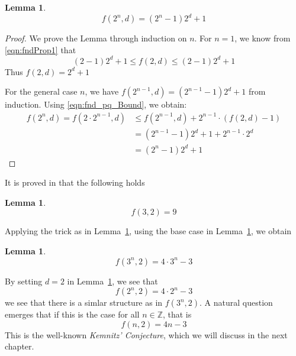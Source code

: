 \documentclass[12pt]{article}
\theoremstyle{definition}
\newtheorem{lemma}[theorem]{Lemma}
\numberwithin{equation}{theorem}
\numberwithin{figure}{theorem}
\newcommand{\kemnitzConjecture}{\emph{Kemnitz' Conjecture}}
\newcommand{\Integer}{\ensuremath{\mathbb{Z}}}
\newcommand{\fnd}[2]{\ensuremath{f(#1,#2)}}
\begin{document}
    \begin{lemma}\label{lem:f_nd_2_potent}
        \begin{equation*}
            \fnd{2^n}{d} = (2^n - 1) 2^d + 1
        \end{equation*}
    \end{lemma}
    \begin{proof}
        We prove the Lemma through induction on $n$.
        For $n = 1$, we know from \eqref{eqn:fndProp1} that
        \begin{equation*}
            (2 - 1)2^d + 1 \leq \fnd{2}{d} \leq (2 - 1)2^d + 1
        \end{equation*}
        Thus $\fnd{2}{d} = 2^d + 1$

        For the general case $n$, we have $f(2^{n-1},d) = (2^{n-1} - 1)2^d + 1$ from induction.
        Using \eqref{eqn:fnd_pq_Bound}, we obtain:
        \begin{align*}
            \fnd{2^n}{d} = \fnd{2 \cdot 2^{n-1}}{d} &\leq \fnd{2^{n-1}}{d} + 2^{n-1} \cdot (\fnd{2}{d} - 1)\\
            &= (2^{n-1} - 1)2^d + 1 + 2^{n-1} \cdot 2^d\\
            &= (2^n - 1) 2^d + 1
        \end{align*}
    \end{proof}
    It is proved in \cite{Harborth1973} that the following holds
    \begin{lemma}\label{lem:f_3_2_Value_Harborth}
        \begin{equation*}
            \fnd{3}{2} = 9
        \end{equation*}
    \end{lemma}
    Applying the trick as in Lemma~\ref{lem:f_nd_2_potent}, using the base case in Lemma~\ref{lem:f_3_2_Value_Harborth}, we obtain 
    \begin{lemma}\label{lem:f_3Potent_2_value}
        \begin{equation*}
            \fnd{3^n}{2} = 4 \cdot 3^n - 3
        \end{equation*}
    \end{lemma}

    By setting $d = 2$ in Lemma~\ref{lem:f_nd_2_potent}, we see that
    \[\fnd{2^n}{2} = 4 \cdot 2^n - 3\]
    we see that there is a simlar structure as in $\fnd{3^n}{2}$. 
    A natural question emerges that if this is the case for all $n \in \Integer$, that is
    \[\fnd{n}{2} = 4n - 3\]
    This is the well-known \kemnitzConjecture{}, which we will discuss in the next chapter.
\newpage
\end{document}
